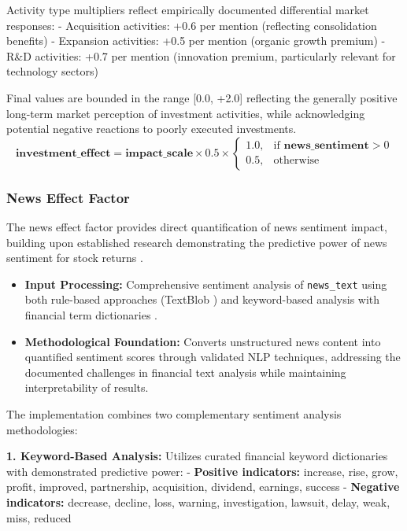 \documentclass[3p,times,procedia]{elsarticle}
\begin{document}
Activity type multipliers reflect empirically documented differential market responses:
- Acquisition activities: +0.6 per mention (reflecting consolidation benefits)
- Expansion activities: +0.5 per mention (organic growth premium)
- R\&D activities: +0.7 per mention (innovation premium, particularly relevant for technology sectors)

Final values are bounded in the range [0.0, +2.0] reflecting the generally positive long-term market perception of investment activities, while acknowledging potential negative reactions to poorly executed investments.
\vspace{-0.3cm}
\begin{equation}
\textbf{investment\_effect} = \textbf{impact\_scale} \times 0.5 \times 
\begin{cases} 
1.0, & \text{if } \textbf{news\_sentiment} > 0 \\
0.5, & \text{otherwise}
\end{cases}
\end{equation}

\subsubsection{{News Effect Factor}}

The news effect factor provides direct quantification of news sentiment impact, building upon established research demonstrating the predictive power of news sentiment for stock returns \cite{TETLOCK2007,Schumaker2009}.

\begin{itemize}
    \item \textbf{Input Processing:} Comprehensive sentiment analysis of \texttt{news\_text} using both rule-based approaches (TextBlob \cite{Loria2019}) and keyword-based analysis with financial term dictionaries \cite{Loughran2011}.
    \item \textbf{Methodological Foundation:} Converts unstructured news content into quantified sentiment scores through validated NLP techniques, addressing the documented challenges in financial text analysis while maintaining interpretability of results.
\end{itemize}

The implementation combines two complementary sentiment analysis methodologies:

\textbf{1. Keyword-Based Analysis:} Utilizes curated financial keyword dictionaries with demonstrated predictive power:
- \textbf{Positive indicators:} increase, rise, grow, profit, improved, partnership, acquisition, dividend, earnings, success
- \textbf{Negative indicators:} decrease, decline, loss, warning, investigation, lawsuit, delay, weak, miss, reduced
\end{document}
